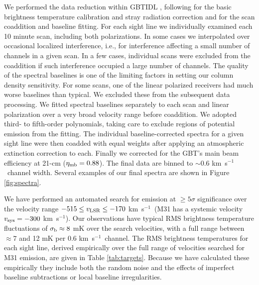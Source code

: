 \documentclass[12pt,preprint]{aastex6}
\newcommand{\kms}{km~s$^{-1}$}
\newcommand{\vlsr}{\ensuremath{v_{\rm LSR}\relax}}
\begin{document}
We performed the data reduction within GBTIDL \citep{marganian2006},
following \citet{boothroyd2011} for the basic brightness temperature
calibration and stray radiation correction and \citet{lockman2012} for
the scan coaddition and baseline fitting. For each sight line we
individually examined each 10 minute scan, including both
polarizations. In some cases we interpolated over occasional localized
interference, i.e., for interference affecting a small number of
channels in a given scan. In a few cases, individual scans were
excluded from the coaddition if such interference occupied a large
number of channels. The quality of the spectral baselines is one of
the limiting factors in setting our column density sensitivity. For
some scans, one of the linear polarized receivers had much worse
baselines than typical.  We excluded these from the subsequent data
processing. We fitted spectral baselines separately to each scan and
linear polarization over a very broad velocity range before
coaddition. We adopted third- to fifth-order polynomials, taking care
to exclude regions of potential emission from the fitting. The
individual baseline-corrected spectra for a given sight line were then
coadded with equal weights after applying an atmospheric extinction
correction to each. Finally we corrected for the GBT's main beam
efficiency at 21-cm ($\eta_{\rm mb} = 0.88$). The final data are
binned to $\sim0.6$ \kms\ channel width. Several examples of our final
spectra are shown in Figure \ref{fig:spectra}.

We have performed an automated search for emission at $\ge 5\sigma$
significance over the velocity range $-515 \le \vlsr \le -170$ \kms\
(M31 has a systemic velocity $v_{\rm sys} = -300$ \kms ). Our
observations have typical RMS brightness temperature fluctuations of
$\sigma_{\rm b} \approx 8$ mK over the search velocities, with a full
range between $\approx 7$ and 12 mK per 0.6 \kms\ channel. The RMS
brightness temperatures for each sight line, derived empirically over
the full range of velocities searched for M31 emission, are given in
Table \ref{tab:targets}. Because we have calculated these empirically
they include both the random noise and the effects of imperfect
baseline subtractions or local baseline irregularities. 
\end{document}
